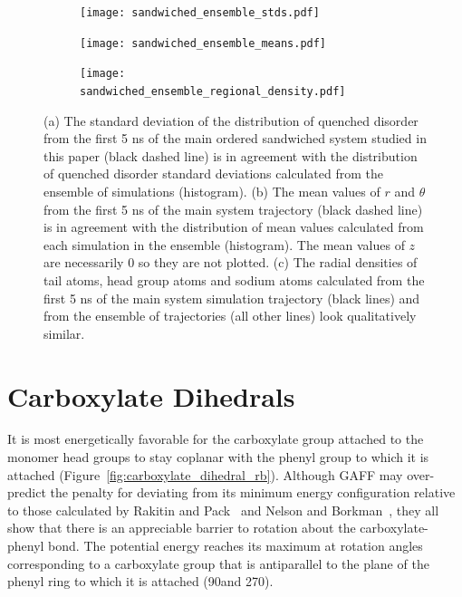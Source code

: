 \documentclass{article}
\begin{document}
  \begin{figure}[!htb]
  \centering
  \begin{subfigure}{0.49\textwidth}
  \texttt{[image: sandwiched\_ensemble\_stds.pdf]}
  \caption{}\label{fig:offset_ensemble_stds}
  \end{subfigure}
  \begin{subfigure}{0.49\textwidth}
  \texttt{[image: sandwiched\_ensemble\_means.pdf]}
  \caption{}\label{fig:offset_ensemble_means}
  \end{subfigure}
  \begin{subfigure}{\textwidth}
  \texttt{[image: sandwiched\_ensemble\_regional\_density.pdf]}
  \caption{}\label{fig:offset_ensemble_regional_density}
  \end{subfigure}
  \caption{(a) The standard deviation of the distribution of quenched disorder
  from the first 5 ns of the main ordered sandwiched system studied in
  this paper (black dashed line) is in agreement with the distribution of quenched disorder 
  standard deviations calculated from the ensemble of simulations (histogram). 
  (b) The mean values of $r$ and $\theta$ from the first 5 ns of the main
  system trajectory (black dashed line) is in agreement with the distribution of mean values
  calculated from each simulation in the ensemble (histogram). The mean values of $z$
  are necessarily 0 so they are not plotted. (c) The radial densities of tail
  atoms, head group atoms and sodium atoms calculated from the first 5 ns of the
  main system simulation trajectory (black lines) and from the ensemble of 
  trajectories (all other lines) look qualitatively similar.}\label{fig:ensemble_stds}
  \end{figure}
  
  \clearpage

  \section{Carboxylate Dihedrals}

  It is most energetically favorable for the carboxylate group attached to the monomer
  head groups to stay coplanar with the phenyl group to which it is attached
  (Figure~\ref{fig:carboxylate_dihedral_rb}). Although GAFF may over-predict the penalty
  for deviating from its minimum energy configuration relative to those calculated 
  by Rakitin and Pack~\cite{rakitin_necessity_2005} and Nelson and
  Borkman~\cite{nelson_internal_1998}, they all show that there is an appreciable barrier
  to rotation about the carboxylate-phenyl bond. The potential energy reaches its maximum
  at rotation angles corresponding to a carboxylate group that is antiparallel to the 
  plane of the phenyl ring to which it is attached (90\degree and 270\degree).
  
\end{document}
